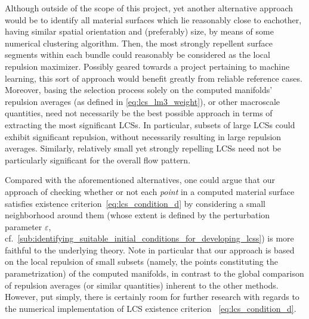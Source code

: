 Although outside of the scope of this project, yet another alternative
approach would be to identify all material surfaces which lie reasonably close
to eachother, having similar spatial orientation and (preferably) size, by
means of some numerical clustering algorithm. Then, the most strongly repellent
surface segments within each bundle could reasonably be considered as the local
repulsion maximizer. Possibly geared towards a project pertaining to machine
learning, this sort of approach would benefit greatly from reliable reference
cases. Moreover, basing the selection process solely on the computed manifolds'
repulsion averages (as defined in \cref{eq:lcs_lm3_weight}), or other
macroscale quantities, need not necessarily be the best possible approach in
terms of extracting the most significant LCSs. In particular, subsets of large
LCSs could exhibit significant repulsion, without necessarily resulting in
large repulsion averages. Similarly, relatively small yet strongly repelling
LCSs need not be particularly significant for the overall flow pattern.

Compared with the aforementioned alternatives, one could argue that our
approach of checking whether or not each \emph{point} in a computed material
surface satisfies existence criterion~\eqref{eq:lcs_condition_d} by considering
a small neighborhood around them (whose extent is defined by the perturbation
parameter $\varepsilon$, cf.\
\cref{sub:identifying_suitable_initial_conditions_for_developing_lcss}) is more
faithful to the underlying theory. Note in particular that our approach is
based on the local repulsion of small subsets (namely, the points constituting
the parametrization) of the computed manifolds, in contrast to the global
comparison of repulsion averages (or similar quantities) inherent to the other
methods. However, put simply, there is certainly room for further research with
regards to the numerical implementation of LCS existence criterion~%
\eqref{eq:lcs_condition_d}.
